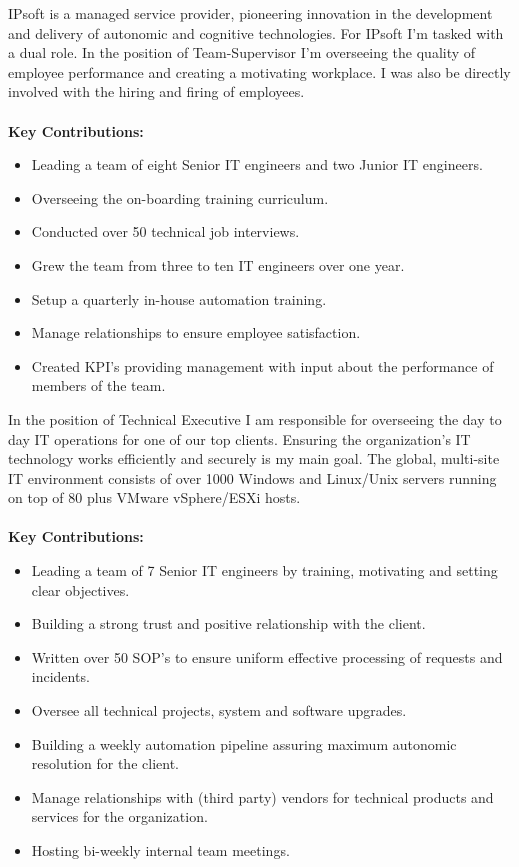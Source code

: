 \vspace{2pt}
IPsoft is a managed service provider, pioneering innovation in the development and delivery of autonomic and cognitive technologies. For IPsoft I'm tasked with a dual role. In the position of Team-Supervisor I'm overseeing the quality of employee performance and creating a motivating workplace. I was also be directly involved with the hiring and firing of employees. \\
\\
\textbf{Key Contributions:}
\begin{itemize}
\item Leading a team of eight Senior IT engineers and two Junior IT engineers.
\item Overseeing the on-boarding training curriculum. 
\item Conducted over 50 technical job interviews.
\item Grew the team from three to ten IT engineers over one year.
\item Setup a quarterly in-house automation training. 
\item Manage relationships to ensure employee satisfaction.
\item Created KPI's providing management with input about the performance of members of the team. \\
\end{itemize}
In the position of Technical Executive I am responsible for overseeing the day to day IT operations for one of our top clients. Ensuring the organization’s IT technology works efficiently and securely is my main goal. The global, multi-site IT environment consists of over 1000 Windows and Linux/Unix servers running on top of 80 plus VMware vSphere/ESXi hosts.\\ 
\\
\textbf{Key Contributions:}
\begin{itemize}
\item Leading a team of 7 Senior IT engineers by training, motivating and setting clear objectives.
\item Building a strong trust and positive relationship with the client. 
\item Written over 50 SOP's to ensure uniform effective processing of requests and incidents.
\item Oversee all technical projects, system and software upgrades. 
\item Building a weekly automation pipeline assuring maximum autonomic resolution for the client. 
\item Manage relationships with (third party) vendors for technical products and services for the organization.
\item Hosting bi-weekly internal team meetings.
\end{itemize}

